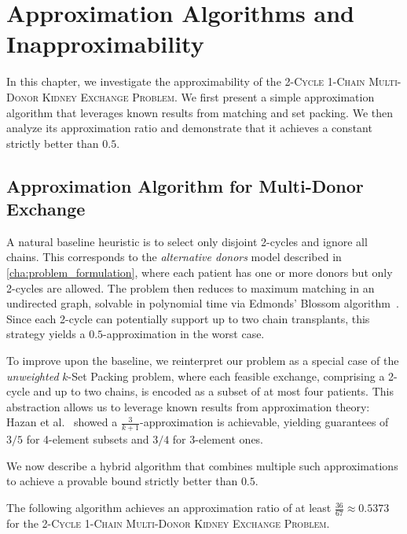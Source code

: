 \chapter{Approximation Algorithms and Inapproximability}
\label{cha:approximation}

In this chapter, we investigate the approximability of the \textsc{2-Cycle 1-Chain Multi-Donor Kidney Exchange Problem}. We first present a simple approximation algorithm that leverages known results from matching and set packing. We then analyze its approximation ratio and demonstrate that it achieves a constant strictly better than $0.5$.

\section{Approximation Algorithm for Multi-Donor Exchange}

A natural baseline heuristic is to select only disjoint 2-cycles and ignore all chains. This corresponds to the \emph{alternative donors} model described in \autoref{cha:problem_formulation}, where each patient has one or more donors but only 2-cycles are allowed. The problem then reduces to maximum matching in an undirected graph, solvable in polynomial time via Edmonds' Blossom algorithm~\cite{edmonds1965paths}. Since each 2-cycle can potentially support up to two chain transplants, this strategy yields a $0.5$-approximation in the worst case.

To improve upon the baseline, we reinterpret our problem as a special case of the \emph{unweighted} $k$-Set Packing problem, where each feasible exchange, comprising a 2-cycle and up to two chains, is encoded as a subset of at most four patients. This abstraction allows us to leverage known results from approximation theory: Hazan et al.~\cite{hazan2006complexity} showed a $\frac{3}{k+1}$-approximation is achievable, yielding guarantees of $3/5$ for 4-element subsets and $3/4$ for 3-element ones.

We now describe a hybrid algorithm that combines multiple such approximations to achieve a provable bound strictly better than $0.5$.

\begin{lemma}
The following algorithm achieves an approximation ratio of at least $\frac{36}{67} \approx 0.5373$ for the \textsc{2-Cycle 1-Chain Multi-Donor Kidney Exchange Problem}.
\end{lemma}

